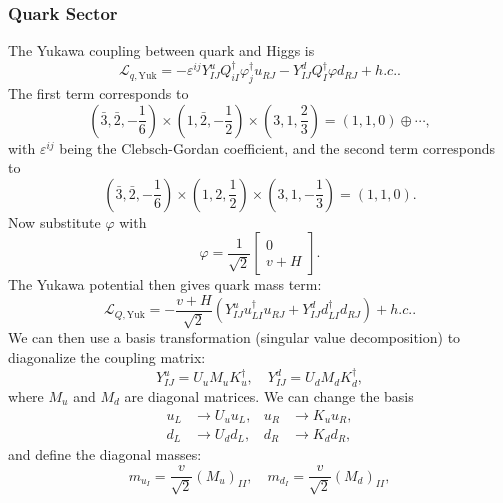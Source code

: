 \subsubsection{Quark Sector}
The Yukawa coupling between quark and Higgs is
\begin{equation}
	\mathcal L_{q,\mathrm{Yuk}}
	= - \varepsilon^{ij} Y^u_{IJ} Q^\dagger_{iI} \varphi^\dagger_j u_{RJ}
	- Y^d_{IJ} Q^\dagger_{I} \varphi d_{RJ} +h.c..
\end{equation}
The first term corresponds to
\begin{equation}
	\left(\bar 3, \bar 2, -\frac{1}{6}\right) \times \left(1, \bar 2, -\frac{1}{2}\right) \times \left(3, 1, \frac{2}{3}\right) = \left(1,1,0\right)\oplus \cdots,
\end{equation}
with $\varepsilon^{ij}$ being the Clebsch-Gordan coefficient, and the second term corresponds to
\begin{equation}
	\left(\bar 3, \bar 2, -\frac{1}{6}\right) \times \left(1, 2, \frac{1}{2}\right) \times \left(3, 1, -\frac{1}{3}\right) = \left(1,1,0\right).
\end{equation}
Now substitute $\varphi$ with 
\begin{equation}
	\varphi = \frac{1}{\sqrt 2} \begin{bmatrix}
		0 \\ v+H
	\end{bmatrix}.
\end{equation}
The Yukawa potential then gives quark mass term:
\begin{equation}
	\mathcal L_{Q,\mathrm{Yuk}}
	= -\frac{v+H}{\sqrt 2} \left( Y^u_{IJ} u^\dagger_{LI} u_{RJ} +Y^d_{IJ} d^\dagger_{LI} d_{RJ} \right) +h.c..
\end{equation}
We can then use a basis transformation (singular value decomposition) to diagonalize the coupling matrix:
\begin{equation}
	Y^u_{IJ} = U_u M_u K^\dagger_u, \quad
	Y^d_{IJ} = U_d M_d K^\dagger_d,
\end{equation}
where $M_u$ and $M_d$ are diagonal matrices.
We can change the basis
\begin{equation}
\begin{aligned}
	u_L &\rightarrow U_u u_L, & u_R &\rightarrow K_u u_R, \\
	d_L &\rightarrow U_d d_L, & d_R &\rightarrow K_d d_R,
\end{aligned}
\end{equation}
and define the diagonal masses:
\begin{equation}
	m_{u_I} = \frac{v}{\sqrt 2} (M_u)_{II}, \quad 
	m_{d_I} = \frac{v}{\sqrt 2} (M_d)_{II},
\end{equation}
